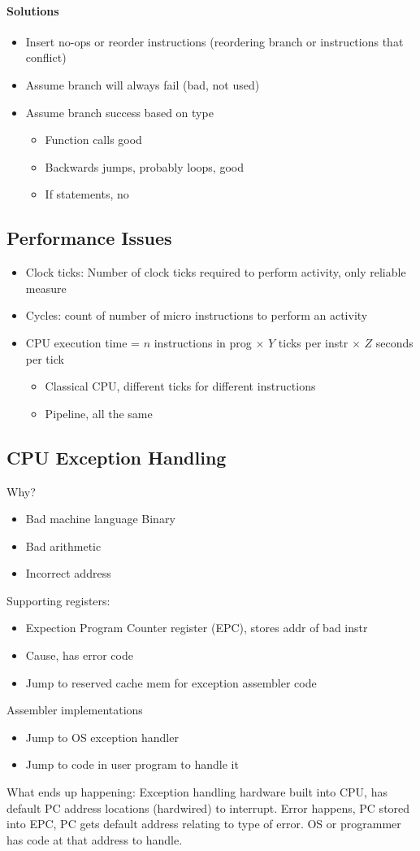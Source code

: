 \documentclass[12 pt]{article}
\begin{document}
\paragraph{Solutions}
\begin{itemize}
\item Insert no-ops or reorder instructions (reordering branch or instructions that conflict)
\item Assume branch will always fail (bad, not used)
\item Assume branch success based on type
\begin{itemize}
\item Function calls good
\item Backwards jumps, probably loops, good
\item If statements, no
\end{itemize}
\end{itemize}
\subsection{Performance Issues}
\begin{itemize}
\item Clock ticks: Number of clock ticks required to perform activity, only reliable measure
\item Cycles: count of number of micro instructions to perform an activity
\item CPU execution time = $n$ instructions in prog $\times$ $Y$ ticks per instr $\times$ $Z$ seconds per tick
\begin{itemize}
\item Classical CPU, different ticks for different instructions
\item Pipeline, all the same
\end{itemize}
\end{itemize}
\subsection{CPU Exception Handling}
Why?
\begin{itemize}
\item Bad machine language Binary
\item Bad arithmetic
\item Incorrect address
\end{itemize}
Supporting registers:
\begin{itemize}
\item Expection Program Counter register (EPC), stores addr of bad instr
\item Cause, has error code
\item Jump to reserved cache mem for exception assembler code
\end{itemize}
Assembler implementations
\begin{itemize}
\item Jump to OS exception handler
\item Jump to code in user program to handle it
\end{itemize}
What ends up happening: Exception handling hardware built into CPU, has default PC address locations (hardwired) to interrupt. Error happens, PC stored into EPC, PC gets default address relating to type of error. OS or programmer has code at that address to handle.
\end{document}

